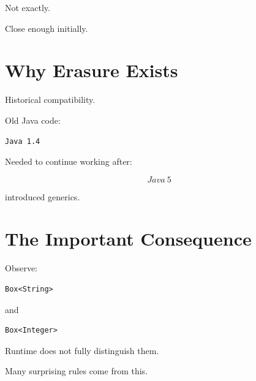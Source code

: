 \documentclass[11pt,a4paper]{book}
\begin{document}

Not exactly.


Close enough initially.


\section{Why Erasure Exists}

Historical compatibility.


Old Java code:

\begin{verbatim}
Java 1.4
\end{verbatim}


Needed to continue working after:

\[
Java\ 5
\]

introduced generics.


\section{The Important Consequence}

Observe:

\begin{verbatim}
Box<String>
\end{verbatim}


and

\begin{verbatim}
Box<Integer>
\end{verbatim}


Runtime does not fully distinguish them.


Many surprising rules come from this.

\end{document}
